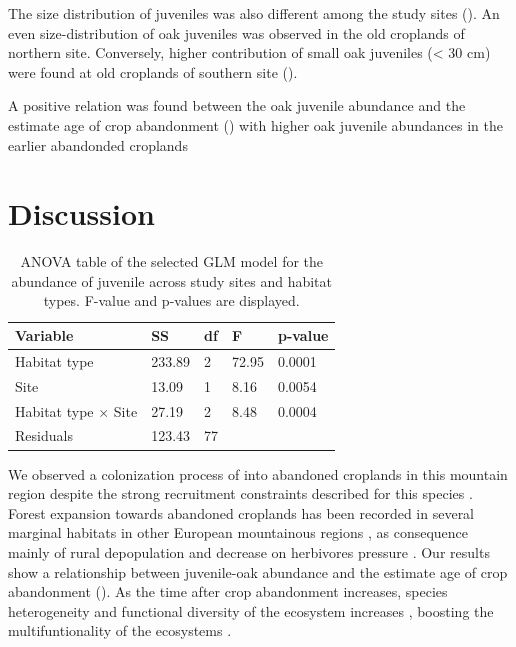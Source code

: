 The size distribution of juveniles was also different among the study sites (). An even size-distribution of oak juveniles was observed in the old croplands of northern site. Conversely, higher contribution of small oak juveniles (< 30 cm) were found at old croplands of southern site (). 

A positive relation was found between the oak juvenile abundance and the estimate age of crop abandonment () with higher oak juvenile abundances in the earlier abandonded croplands 

\section{Discussion}\label{sec:coloniza:disussion}

\begin{table}
\caption{ANOVA table of the selected GLM model for the abundance of \Qpy juvenile across study sites and habitat types. F-value and p-values are displayed.}
\centering
\begin{tabular}{lllll} 
\toprule
\textbf{Variable}        & \textbf{SS} & \textbf{df} & \textbf{F} & \textbf{p-value}  \\ 
\midrule
Habitat type             & 233.89      & 2           & 72.95      &  0.0001           \\
Site                     & 13.09       & 1           & 8.16       & 0.0054            \\
Habitat type $\times$ Site & 27.19       & 2           & 8.48       & 0.0004            \\
Residuals                & 123.43      & 77          &            &                   \\
\bottomrule
\end{tabular}
\label{tab:coloniza:anova}
\end{table}

We observed a colonization process of \Qpy into abandoned croplands in this mountain region despite the strong recruitment constraints described for this species \autocites{Bravoetal2008SelviculturaMontes,Gomez2003ImpactVertebrate,Pereaetal2014InteraccionesPlantaanimal}. Forest expansion towards abandoned croplands has been recorded in several marginal habitats in other European mountainous regions \autocites{Amezteguietal2016LanduseLegacies,Nataleetal2007StudyTree,Piussi2000ExpansionEuropean,Amezteguietal2010LanduseChanges,LasantaMartinezetal2005MountainMediterranean,Kozak2003ForestCover,AlvarezMartinezetal2014InfluenceLand,VicenteSerranoetal2004AnalysisSpatial}, as consequence mainly of rural depopulation and decrease on herbivores pressure \autocite{MacDonaldetal2000AgriculturalAbandonment,EuropeanEnvironmentAgency2016EuropeanForest}. Our results show a relationship between juvenile-oak abundance and the estimate age of crop abandonment (). As the time after crop abandonment increases, species heterogeneity and functional diversity of the ecosystem increases \autocites{PuertaPineroetal2012HistoryMatters,HermyVerheyen2007LegaciesPresentday}, boosting the multifuntionality of the ecosystems \autocite{CruzAlonsoetal2019LongTerm}. 

